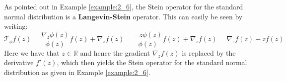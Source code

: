 \renewcommand{\thetheorem}{2.9}
\begin{example}
As pointed out in Example \ref{example:2_6}, the Stein operator for the standard normal distribution is a \textbf{Langevin-Stein} operator. This can easily be seen by writing:
\begin{equation*}
\mathcal{T}_{\phi}f(z)  = \frac{\nabla_z \phi(z)}{\phi(z)}f(z) + \nabla_z f(z) = \frac{-z \phi(z)}{\phi(z)}f(z) + \nabla_z f(z) = \nabla_z f(z) - z f(z)
\end{equation*}
Here we have that $z \in \mathbb{R}$ and hence the gradient $\nabla_z f(z)$ is replaced by the derivative $f'(z)$, which then yields the Stein operator for the standard normal distribution as given in Example \ref{example:2_6}.
\end{example}

